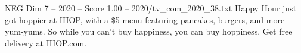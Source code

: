\begin{textsample}{NEG Dim 7 – 2020 – Score 1.00 – 2020/tv\_com\_2020\_38.txt}  \label{ex:f7_neg_012}
Happy Hour just got hoppier at IHOP, with a \$5 menu featuring pancakes, burgers, and more yum-yums.
So while you can't buy happiness, you can buy hoppiness.
Get free delivery at IHOP.com.

\end{textsample}
